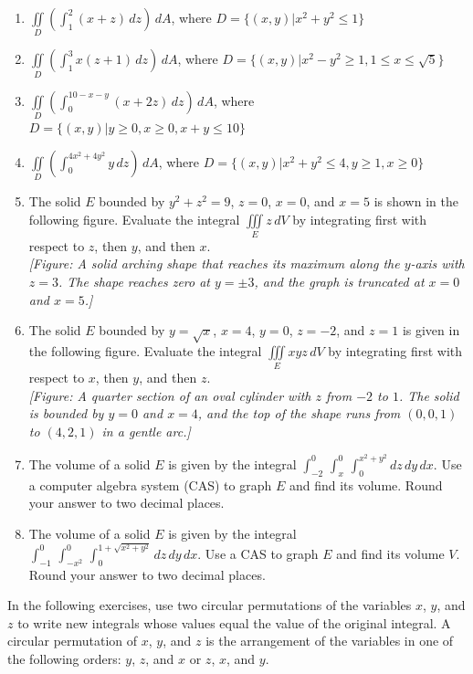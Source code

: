 \documentclass{exercises}
\begin{document}
\begin{enumerate}[resume]
\item $\underset{D}{\iint}(\int_{1}^{2}(x+z)\,dz)\,dA$, where $D=\{(x,y)|x^{2}+y^{2}\le1\}$
\item $\underset{D}{\iint}(\int_{1}^{3}x(z+1)\,dz)\,dA$, where $D=\{(x,y)|x^{2}-y^{2}\ge1,1\le x\le \sqrt{5}\}$
\item $\underset{D}{\iint}(\int_{0}^{10-x-y}(x+2z)\,dz)\,dA$, where $D=\{(x,y)|y\ge0,x\ge0,x+y\le10\}$
\item $\underset{D}{\iint}(\int_{0}^{4x^{2}+4y^{2}}y\,dz)\,dA$, where $D=\{(x,y)|x^{2}+y^{2}\le4,y\ge1,x\ge0\}$
\item The solid $E$ bounded by $y^{2}+z^{2}=9$, $z=0$, $x=0$, and $x=5$ is shown in the following figure. Evaluate the integral $\underset{E}{\iiint}z\,dV$ by integrating first with respect to $z$, then $y$, and then $x$. \\ \textit{[Figure: A solid arching shape that reaches its maximum along the $y$-axis with $z=3$. The shape reaches zero at $y=\pm3$, and the graph is truncated at $x=0$ and $x=5$.]}
\item The solid $E$ bounded by $y=\sqrt{x}$, $x=4$, $y=0$, $z=-2$, and $z=1$ is given in the following figure. Evaluate the integral $\underset{E}{\iiint}xyz\,dV$ by integrating first with respect to $x$, then $y$, and then $z$. \\ \textit{[Figure: A quarter section of an oval cylinder with $z$ from $-2$ to $1$. The solid is bounded by $y=0$ and $x=4$, and the top of the shape runs from $(0,0,1)$ to $(4,2,1)$ in a gentle arc.]}
\item \techrequired The volume of a solid $E$ is given by the integral $\int_{-2}^{0}\,\int_{x}^{0}\,\int_{0}^{x^{2}+y^{2}}dz\,dy\,dx$. Use a computer algebra system (CAS) to graph $E$ and find its volume. Round your answer to two decimal places.
\item \techrequired The volume of a solid $E$ is given by the integral $\int_{-1}^{0}\,\int_{-x^{2}}^{0}\,\int_{0}^{1+\sqrt{x^{2}+y^{2}}}dz\,dy\,dx$. Use a CAS to graph $E$ and find its volume $V$. Round your answer to two decimal places.
\end{enumerate}

In the following exercises, use two circular permutations of the variables $x$, $y$, and $z$ to write new integrals whose values equal the value of the original integral. A circular permutation of $x$, $y$, and $z$ is the arrangement of the variables in one of the following orders: $y$, $z$, and $x$ or $z$, $x$, and $y$.
\end{document}
